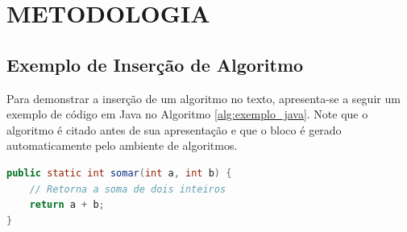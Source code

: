 
\chapter[Metodologia]{METODOLOGIA} \label{sec:metodologia}

\section{Exemplo de Inserção de Algoritmo}

Para demonstrar a inserção de um algoritmo no texto, apresenta-se a seguir um exemplo de código em Java no Algoritmo \ref{alg:exemplo_java}. Note que o algoritmo é citado antes de sua apresentação e que o bloco é gerado automaticamente pelo ambiente de algoritmos.
\begin{algorithm}[htb]
    \caption{Exemplo de Algoritmo em Java}
    \label{alg:exemplo_java}
    \begin{lstlisting}[language=Java]
public static int somar(int a, int b) {
    // Retorna a soma de dois inteiros
    return a + b;
}
    \end{lstlisting}
\end{algorithm}

